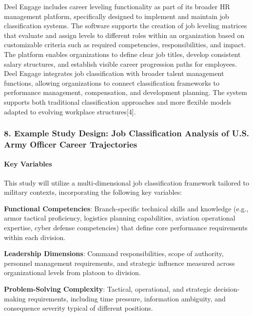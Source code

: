 \documentclass[./main.tex]{subfiles}
\begin{document}
Deel Engage includes career leveling functionality as part of its
broader HR management platform, specifically designed to implement and
maintain job classification systems. The software supports the creation
of job leveling matrices that evaluate and assign levels to different
roles within an organization based on customizable criteria such as
required competencies, responsibilities, and impact. The platform
enables organizations to define clear job titles, develop consistent
salary structures, and establish visible career progression paths for
employees. Deel Engage integrates job classification with broader talent
management functions, allowing organizations to connect classification
frameworks to performance management, compensation, and development
planning. The system supports both traditional classification approaches
and more flexible models adapted to evolving workplace
structures{[}4{]}.

\subsubsection{8. Example Study Design: Job Classification Analysis of U.S.
Army Officer Career
Trajectories}\label{example-study-design-job-classification-analysis-of-u.s.-army-officer-career-trajectories}

\paragraph{Key Variables}\label{key-variables}

This study will utilize a multi-dimensional job classification framework
tailored to military contexts, incorporating the following key
variables:

\textbf{Functional Competencies}: Branch-specific technical skills and
knowledge (e.g., armor tactical proficiency, logistics planning
capabilities, aviation operational expertise, cyber defense
competencies) that define core performance requirements within each
division.

\textbf{Leadership Dimensions}: Command responsibilities, scope of
authority, personnel management requirements, and strategic influence
measured across organizational levels from platoon to division.

\textbf{Problem-Solving Complexity}: Tactical, operational, and
strategic decision-making requirements, including time pressure,
information ambiguity, and consequence severity typical of different
positions.
\end{document}
